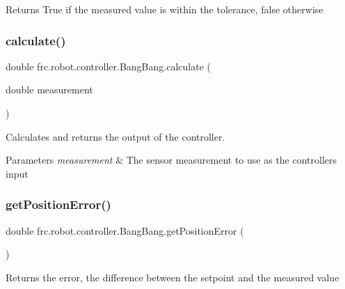 \begin{DoxyReturn}{Returns}
True if the measured value is within the tolerance, false otherwise 
\end{DoxyReturn}
\mbox{\label{classfrc_1_1robot_1_1controller_1_1_bang_bang_a02c8b64948151db1265400764f32267e}} 
\subsubsection{\texorpdfstring{calculate()}{calculate()}}
{\footnotesize\ttfamily double frc.\+robot.\+controller.\+Bang\+Bang.\+calculate (\begin{DoxyParamCaption}\item[{double}]{measurement }\end{DoxyParamCaption})\hspace{0.3cm}{\ttfamily [inline]}}

Calculates and returns the output of the controller.


\begin{DoxyParams}{Parameters}
{\em measurement} & The sensor measurement to use as the controller\textquotesingle{}s input \\
\hline
\end{DoxyParams}
\mbox{\label{classfrc_1_1robot_1_1controller_1_1_bang_bang_a5f5b51419c46afefe241d52b932fca17}} 
\subsubsection{\texorpdfstring{getPositionError()}{getPositionError()}}
{\footnotesize\ttfamily double frc.\+robot.\+controller.\+Bang\+Bang.\+get\+Position\+Error (\begin{DoxyParamCaption}{ }\end{DoxyParamCaption})\hspace{0.3cm}{\ttfamily [inline]}}

Returns the error, the difference between the setpoint and the measured value

